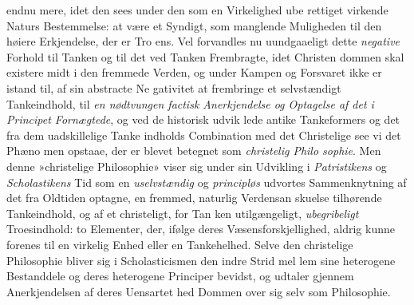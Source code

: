 endnu mere, idet den sees under den som en Virkelighed ube\-%
rettiget virkende Naturs Bestemmelse: at være et Syndigt, som
manglende Muligheden til den høiere Erkjendelse, der er Tro\-%
ens. Vel forvandles nu uundgaaeligt dette \emph{negative} Forhold
til Tanken og til det ved Tanken Frembragte, idet Christen\-%
dommen skal existere midt i den fremmede Verden, og under
Kampen og Forsvaret ikke er istand til, af sin abstracte Ne\-%
gativitet at frembringe et selvstændigt Tankeindhold, til \emph{en
 nødtvungen factisk Anerkjendelse og Optagelse af
det i Principet Fornægtede}, og ved de historisk udvik\-%
lede antike Tankeformers og det fra dem uadskillelige Tanke\-%
indholds Combination med det Christelige see vi det Phæno\-%
men opstaae, der er blevet betegnet som \emph{christelig Philo\-%
sophie}. Men denne »christelige Philosophie» viser sig under
sin Udvikling i \emph{Patristikens} og \emph{Scholastikens} Tid som
en \emph{uselvstændig} og \emph{principløs} udvortes Sammenknytning
af det fra Oldtiden optagne, en fremmed, naturlig Verdensan\-%
skuelse tilhørende Tankeindhold, og af et christeligt, for Tan\-%
ken utilgængeligt, \emph{ubegribeligt} Troesindhold: to Elementer,
der, ifølge deres Væsensforskjellighed, aldrig kunne forenes til
en virkelig Enhed eller en Tankehelhed. Selve den christelige
Philosophie bliver sig i Scholasticismen den indre Strid mel\-%
lem sine heterogene Bestanddele og deres heterogene Principer
bevidst, og udtaler gjennem Anerkjendelsen af deres Uensartet\-%
hed Dommen over sig selv som Philosophie.

